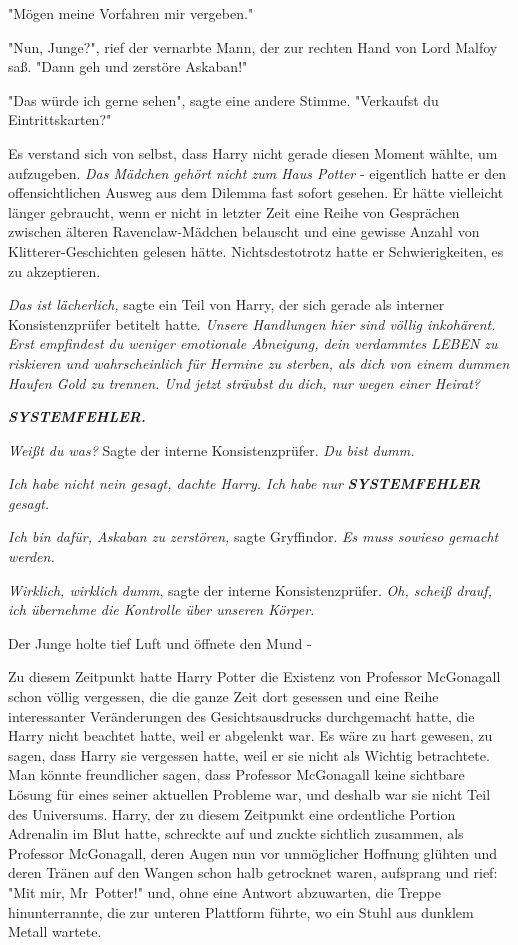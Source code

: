 {"Mögen meine Vorfahren mir vergeben."

"Nun, Junge?", rief der vernarbte Mann, der zur rechten Hand von Lord Malfoy saß. "Dann geh und zerstöre Askaban!"

"Das würde ich gerne sehen", sagte eine andere Stimme. "Verkaufst du Eintrittskarten?"

Es verstand sich von selbst, dass Harry nicht gerade diesen Moment wählte, um aufzugeben. \emph{Das Mädchen gehört nicht zum Haus Potter} - eigentlich hatte er den offensichtlichen Ausweg aus dem Dilemma fast sofort gesehen. Er hätte vielleicht länger gebraucht, wenn er nicht in letzter Zeit eine Reihe von Gesprächen zwischen älteren Ravenclaw-Mädchen belauscht und eine gewisse Anzahl von Klitterer-Geschichten gelesen hätte. Nichtsdestotrotz hatte er Schwierigkeiten, es zu akzeptieren.

\emph{Das ist lächerlich,} sagte ein Teil von Harry, der sich gerade als interner Konsistenzprüfer betitelt hatte. \emph{Unsere Handlungen hier sind völlig inkohärent. Erst empfindest du weniger emotionale Abneigung, dein verdammtes LEBEN zu riskieren und wahrscheinlich für Hermine zu sterben, als dich von einem dummen Haufen Gold zu trennen. Und jetzt sträubst du dich, nur wegen einer Heirat?}

\textbf{\emph{SYSTEMFEHLER.}}

\emph{Weißt du was?} Sagte der interne Konsistenzprüfer. \emph{Du bist dumm.}

\emph{Ich habe nicht nein gesagt, dachte Harry. Ich habe nur} \textbf{\emph{SYSTEMFEHLER}} \emph{gesagt.}

\emph{Ich bin dafür, Askaban zu zerstören,} sagte Gryffindor. \emph{Es muss sowieso gemacht werden.}

\emph{Wirklich, wirklich dumm}, sagte der interne Konsistenzprüfer. \emph{Oh, scheiß drauf, ich übernehme die Kontrolle über unseren Körper.}

Der Junge holte tief Luft und öffnete den Mund -

Zu diesem Zeitpunkt hatte Harry Potter die Existenz von Professor McGonagall schon völlig vergessen, die die ganze Zeit dort gesessen und eine Reihe interessanter Veränderungen des Gesichtsausdrucks durchgemacht hatte, die Harry nicht beachtet hatte, weil er abgelenkt war. Es wäre zu hart gewesen, zu sagen, dass Harry sie vergessen hatte, weil er sie nicht als Wichtig betrachtete. Man könnte freundlicher sagen, dass Professor McGonagall keine sichtbare Lösung für eines seiner aktuellen Probleme war, und deshalb war sie nicht Teil des Universums. Harry, der zu diesem Zeitpunkt eine ordentliche Portion Adrenalin im Blut hatte, schreckte auf und zuckte sichtlich zusammen, als Professor McGonagall, deren Augen nun vor unmöglicher Hoffnung glühten und deren Tränen auf den Wangen schon halb getrocknet waren, aufsprang und rief: "Mit mir, Mr~Potter!" und, ohne eine Antwort abzuwarten, die Treppe hinunterrannte, die zur unteren Plattform führte, wo ein Stuhl aus dunklem Metall wartete.

}
